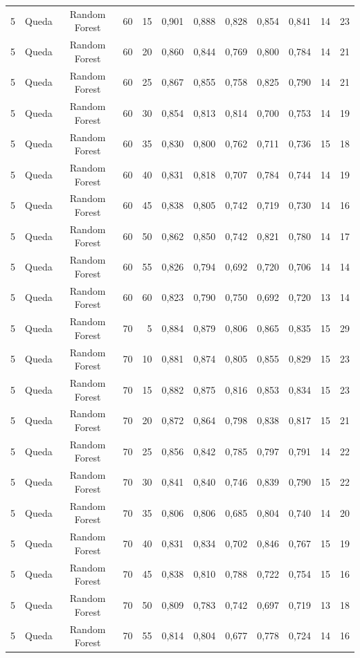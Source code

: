 \begin{longtable}{ccclrrrrrrrr}
5 & Queda & Random Forest & 60 & 15 & 0,901 & 0,888 & 0,828 & 0,854 & 0,841 & 14 & 23 \\
5 & Queda & Random Forest & 60 & 20 & 0,860 & 0,844 & 0,769 & 0,800 & 0,784 & 14 & 21 \\
5 & Queda & Random Forest & 60 & 25 & 0,867 & 0,855 & 0,758 & 0,825 & 0,790 & 14 & 21 \\
5 & Queda & Random Forest & 60 & 30 & 0,854 & 0,813 & 0,814 & 0,700 & 0,753 & 14 & 19 \\
5 & Queda & Random Forest & 60 & 35 & 0,830 & 0,800 & 0,762 & 0,711 & 0,736 & 15 & 18 \\
5 & Queda & Random Forest & 60 & 40 & 0,831 & 0,818 & 0,707 & 0,784 & 0,744 & 14 & 19 \\
5 & Queda & Random Forest & 60 & 45 & 0,838 & 0,805 & 0,742 & 0,719 & 0,730 & 14 & 16 \\
5 & Queda & Random Forest & 60 & 50 & 0,862 & 0,850 & 0,742 & 0,821 & 0,780 & 14 & 17 \\
5 & Queda & Random Forest & 60 & 55 & 0,826 & 0,794 & 0,692 & 0,720 & 0,706 & 14 & 14 \\
5 & Queda & Random Forest & 60 & 60 & 0,823 & 0,790 & 0,750 & 0,692 & 0,720 & 13 & 14 \\
5 & Queda & Random Forest & 70 & 5 & 0,884 & 0,879 & 0,806 & 0,865 & 0,835 & 15 & 29 \\
5 & Queda & Random Forest & 70 & 10 & 0,881 & 0,874 & 0,805 & 0,855 & 0,829 & 15 & 23 \\
5 & Queda & Random Forest & 70 & 15 & 0,882 & 0,875 & 0,816 & 0,853 & 0,834 & 15 & 23 \\
5 & Queda & Random Forest & 70 & 20 & 0,872 & 0,864 & 0,798 & 0,838 & 0,817 & 15 & 21 \\
5 & Queda & Random Forest & 70 & 25 & 0,856 & 0,842 & 0,785 & 0,797 & 0,791 & 14 & 22 \\
5 & Queda & Random Forest & 70 & 30 & 0,841 & 0,840 & 0,746 & 0,839 & 0,790 & 15 & 22 \\
5 & Queda & Random Forest & 70 & 35 & 0,806 & 0,806 & 0,685 & 0,804 & 0,740 & 14 & 20 \\
5 & Queda & Random Forest & 70 & 40 & 0,831 & 0,834 & 0,702 & 0,846 & 0,767 & 15 & 19 \\
5 & Queda & Random Forest & 70 & 45 & 0,838 & 0,810 & 0,788 & 0,722 & 0,754 & 15 & 16 \\
5 & Queda & Random Forest & 70 & 50 & 0,809 & 0,783 & 0,742 & 0,697 & 0,719 & 13 & 18 \\
5 & Queda & Random Forest & 70 & 55 & 0,814 & 0,804 & 0,677 & 0,778 & 0,724 & 14 & 16 \\

\end{longtable}
